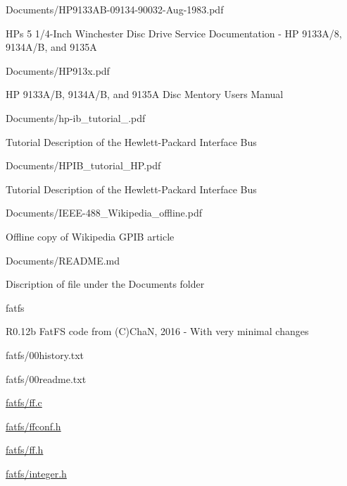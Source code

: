 \begin{DoxyItemize}
\item Documents/\+H\+P9133\+A\+B-\/09134-\/90032-\/\+Aug-\/1983.\+pdf
\begin{DoxyItemize}
\item H\+Ps 5 1/4-\/\+Inch Winchester Disc Drive Service Documentation -\/ HP 9133\+A/8, 9134\+A/B, and 9135A
\end{DoxyItemize}
\item Documents/\+H\+P913x.\+pdf
\begin{DoxyItemize}
\item HP 9133\+A/B, 9134\+A/B, and 9135A Disc Mentory Users Manual
\end{DoxyItemize}
\item Documents/hp-\/ib\+\_\+tutorial\+\_.\+pdf
\begin{DoxyItemize}
\item Tutorial Description of the Hewlett-\/\+Packard Interface Bus
\end{DoxyItemize}
\item Documents/\+H\+P\+I\+B\+\_\+tutorial\+\_\+\+H\+P.\+pdf
\begin{DoxyItemize}
\item Tutorial Description of the Hewlett-\/\+Packard Interface Bus
\end{DoxyItemize}
\item Documents/\+I\+E\+E\+E-\/488\+\_\+\+Wikipedia\+\_\+offline.\+pdf
\begin{DoxyItemize}
\item Offline copy of Wikipedia G\+P\+IB article
\end{DoxyItemize}
\item Documents/\+R\+E\+A\+D\+M\+E.\+md
\begin{DoxyItemize}
\item Discription of file under the Documents folder
\end{DoxyItemize}
\item fatfs
\begin{DoxyItemize}
\item R0.\+12b Fat\+FS code from (C)ChaN, 2016 -\/ With very minimal changes
\item fatfs/00history.\+txt
\item fatfs/00readme.\+txt
\item \hyperlink{ff_8c}{fatfs/ff.\+c}
\item \hyperlink{ffconf_8h}{fatfs/ffconf.\+h}
\item \hyperlink{ff_8h}{fatfs/ff.\+h}
\item \hyperlink{integer_8h}{fatfs/integer.\+h}

\end{DoxyItemize}
\end{DoxyItemize}
